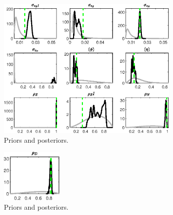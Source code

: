  
\begin{figure}[H]
\centering
\includegraphics[width=0.80\textwidth]{BRS_est_shopping/Output/BRS_est_shopping_PriorsAndPosteriors1}
\caption{Priors and posteriors.}\label{Fig:PriorsAndPosteriors:1}
\end{figure}
 
\begin{figure}[H]
\centering
\includegraphics[width=0.27\textwidth]{BRS_est_shopping/Output/BRS_est_shopping_PriorsAndPosteriors2}
\caption{Priors and posteriors.}\label{Fig:PriorsAndPosteriors:2}
\end{figure}
 
